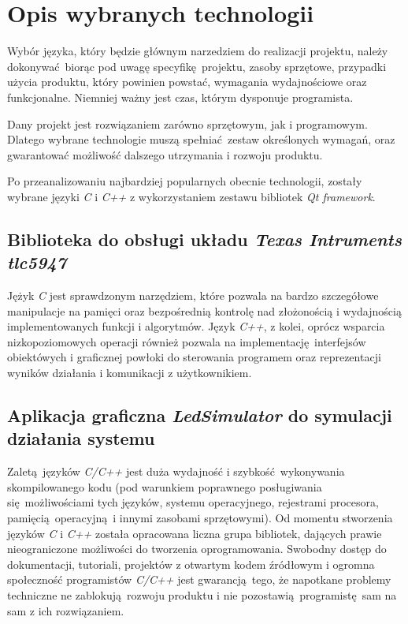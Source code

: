 \documentclass[eng,printmode]{mgr}
\begin{document}

\chapter{Opis wybranych technologii}
\label{chap:technologies}

Wybór języka, który będzie głównym narzedziem do realizacji projektu, należy dokonywać biorąc pod uwagę specyfikę projektu, zasoby sprzętowe, przypadki użycia produktu, który powinien powstać, wymagania wydajnościowe oraz funkcjonalne. Niemniej ważny jest czas, którym dysponuje programista. 

Dany projekt jest rozwiązaniem zarówno sprzętowym, jak i programowym. Dlatego wybrane technologie muszą spełniać zestaw określonych wymagań, oraz gwarantować możliwość dalszego utrzymania i rozwoju produktu.

Po przeanalizowaniu najbardziej popularnych obecnie technologii, zostały wybrane języki \emph{C} i \emph{C++} z wykorzystaniem zestawu bibliotek \emph{Qt framework}.

\section{Biblioteka do obsługi układu \emph{Texas Intruments tlc5947}}
Jężyk \emph{C} jest sprawdzonym narzędziem, które pozwala na bardzo szczegółowe manipulacje na pamięci oraz bezpośrednią kontrolę nad złożonością i wydajnością implementowanych funkcji i algorytmów. Język \emph{C++}, z kolei, oprócz wsparcia nizkopoziomowych operacji również pozwala na implementację interfejsów obiektówych i graficznej powłoki do sterowania programem oraz reprezentacji wyników działania i komunikacji z użytkownikiem.


\section{Aplikacja graficzna \emph{LedSimulator} do symulacji działania systemu}
Zaletą języków \emph{C/C++} jest duża wydajność i szybkość wykonywania skompilowanego kodu (pod warunkiem poprawnego posługiwania się możliwościami tych języków, systemu operacyjnego, rejestrami procesora, pamięcią operacyjną i innymi zasobami sprzętowymi). Od momentu stworzenia języków \emph{C} i \emph{C++} została opracowana liczna grupa bibliotek, dających prawie nieograniczone możliwości do tworzenia oprogramowania. Swobodny dostęp do dokumentacji, tutoriali, projektów z otwartym kodem źródłowym i ogromna społeczność programistów \emph{C/C++} jest gwarancją tego, że napotkane problemy techniczne ne zablokują rozwoju produktu i nie pozostawią programistę sam na sam z ich rozwiązaniem.
\end{document}

